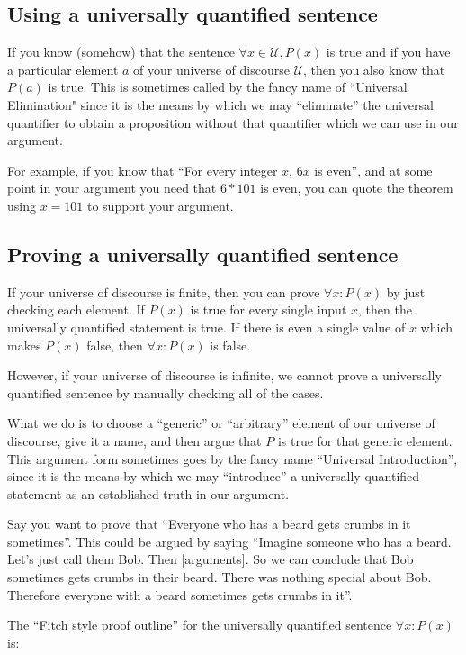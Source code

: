 \subsection{Using a universally quantified sentence}

If you know (somehow) that the sentence $\forall x \in \mathcal{U}, P(x)$ is true and if you have a particular element $a$ of your universe of discourse $\mathcal{U}$, then you also know that $P(a)$ is true.  This is sometimes called by the fancy name of ``Universal Elimination" since it is the means by which we may ``eliminate'' the universal quantifier to obtain a proposition without that quantifier which we can use in our argument.

For example, if you know that ``For every integer $x$, $6x$ is even'', and at some point in your argument you need that $6*101$ is even, you can  quote the theorem using $x = 101$ to support your argument.

\subsection{Proving a universally quantified sentence}

If your universe of discourse is finite, then you can prove $\forall x: P(x)$ by just checking each element.  If $P(x)$ is true for every single input $x$, then the universally quantified statement is true.  If there is even a single value of $x$ which makes $P(x)$ false, then $\forall x: P(x)$ is false.

However, if your universe of discourse is infinite, we cannot prove a universally quantified sentence by manually checking all of the cases.  

What we do is to choose a ``generic'' or ``arbitrary'' element of our universe of discourse, give it a name, and then argue that $P$ is true for that generic element.  This argument form sometimes goes by the fancy name ``Universal Introduction'', since it is the means by which we may ``introduce'' a universally quantified statement as an established truth in our argument.

Say you want to prove that ``Everyone who has a beard gets crumbs in it sometimes''.  This could be argued by saying ``Imagine someone who has a beard. Let's just call them Bob.  Then [arguments].  So we can conclude that Bob sometimes gets crumbs in their beard.  There was nothing special about Bob.  Therefore everyone with a beard sometimes gets crumbs in it''.

The ``Fitch style proof outline'' for the universally quantified sentence  $\forall x: P(x)$ is:

